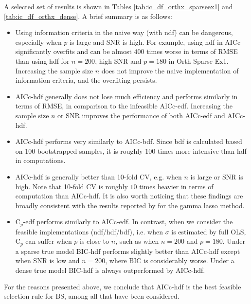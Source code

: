 A selected set of results is shown in Tables \ref{tab:ic_df_orthx_sparseex1} and \ref{tab:ic_df_orthx_dense}. A brief summary is as follows:
\begin{itemize}
	\item Using information criteria in the naive way (with ndf) can be dangerous, especially when $p$ is large and SNR is high. For example, using ndf in AICc significantly overfits and can be almost $400$ times worse in terms of RMSE than using hdf for $n=200$, high SNR and $p=180$ in Orth-Sparse-Ex1. Increasing the sample size $n$ does not improve the naive implementation of information criteria, and the overfiting persists.
	\item AICc-hdf generally does not lose much efficiency and performs similarly in terms of RMSE, in comparison to the infeasible AICc-edf. Increasing the sample size $n$ or SNR improves the performance of both AICc-edf and AICc-hdf. 
	\item AICc-hdf performs very similarly to AICc-bdf. Since bdf is calculated based on $100$ bootstrapped samples, it is roughly $100$ times more intensive than hdf in computations. 
	\item AICc-hdf is generally better than 10-fold CV, e.g. when $n$ is large or SNR is high. Note that 10-fold CV is roughly $10$ times heavier in terms of computation than AICc-hdf. It is also worth noticing that these findings are broadly consistent with the results reported by \citet{Taddy2017} for the gamma lasso method. 
	\item C$_p$-edf performs similarly to AICc-edf. In contrast, when we consider the feasible implementations (ndf/hdf/bdf), i.e. when $\sigma$ is estimated by full OLS, C$_p$ can suffer when $p$ is close to $n$, such as when $n=200$ and $p=180$. Under a sparse true model BIC-hdf performs slightly better than AICc-hdf except when SNR is low and $n=200$, where BIC is considerably worse. Under a dense true model BIC-hdf is always outperformed by AICc-hdf. 
\end{itemize}
For the reasons presented above, we conclude that AICc-hdf is the best feasible selection rule for BS, among all that have been considered.







